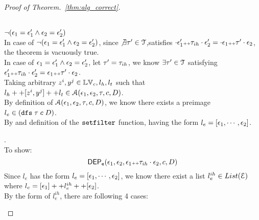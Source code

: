\begin{proof}[Proof of Theorem.~\ref{thm:alg_correct}]
\begin{case}
\\
$\neg(\mathtt{\epsilon}_1 = \mathtt{\epsilon}_1' \land  \mathtt{\epsilon}_2 = \mathtt{\epsilon}_2')$
\\
In case of $\neg(\mathtt{\epsilon}_1 = \mathtt{\epsilon}_1' \land  \mathtt{\epsilon}_2 = \mathtt{\epsilon}_2')$, since 
$\not\exists \mathtt{\tau}' \in \mathcal{T}$,satisfies $
\cdot {} \mathtt{\epsilon}_1' {}{\scriptscriptstyle ++} \mathtt{\tau}_{ih} \cdot {} \mathtt{\epsilon}_2'  = \cdot {} \mathtt{\epsilon}_1 {\scriptscriptstyle ++} \mathtt{\tau}' \cdot \mathtt{\epsilon}_2$, 
the theorem is vacuously true.
\\
%
In case of $\mathtt{\epsilon}_1 = \mathtt{\epsilon}_1' \land  \mathtt{\epsilon}_2 = \mathtt{\epsilon}_2'$,
let $\mathtt{\tau}' = \mathtt{\tau}_{ih}$, we know $\exists \mathtt{\tau}' \in \mathcal{T}$ satisfying 
$\mathtt{\epsilon}_1'  {}{\scriptscriptstyle ++} \mathtt{\tau}_{ih} \cdot {} \mathtt{\epsilon}_2' = \mathtt{\epsilon}_1 {\scriptscriptstyle ++} \mathtt{\tau}' \cdot \mathtt{\epsilon}_2$.
\\
Taking arbitrary $z^i, y^j \in \mathbb{LV}_c, l_h, l_t$ such that 
$l_h ++ [z^i, y^j] ++ l_t \in \mathcal{A}(\mathtt{\epsilon}_1, \mathtt{\epsilon}_2, \mathtt{\tau}, c, D)$.
\\
By definition of $\mathcal{A}(\mathtt{\epsilon}_1, \mathtt{\epsilon}_2, \mathtt{\tau}, c, D)$,
we know there exists a preimage $l_e \in (\mathtt{dfs} \; \mathtt{\tau} \; c \;  D )$.
\\
By and definition of the 
$\mathtt{setfilter}$ function,
having the form $l_e = [\mathtt{\epsilon}_1, \cdots, \mathtt{\epsilon}_2]$. 
\\
\begin{subproof}.
  \\
  To show:
\[  
\mathsf{DEP_{\mathtt{e}}}(\mathtt{\epsilon}_1, \mathtt{\epsilon}_2, \mathtt{\epsilon}_1 {\scriptscriptstyle ++} \mathtt{\tau}_{ih} \cdot \mathtt{\epsilon}_2, {c}, D) 
\]
Since $l_e$ has the form $l_e = [\mathtt{\epsilon}_1, \cdots, \mathtt{\epsilon}_2] $, 
we know there exist a list $l^{ih}_e \in List(\mathcal{E})$
where $l_e = [\mathtt{\epsilon}_1] ++ l^{ih}_e ++ [\mathtt{\epsilon}_2]$.
\\
By the form of $l^{ih}_e$, there are following 4 cases:


\end{subproof}
\end{case}
\end{proof}
